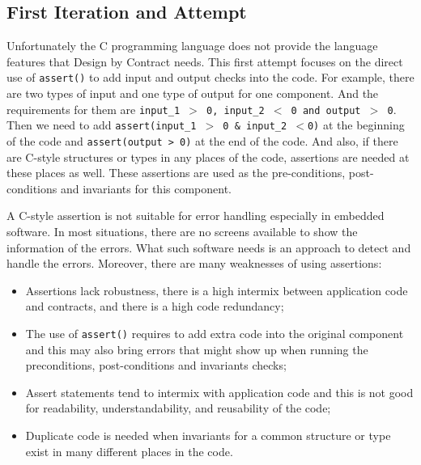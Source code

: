 
\subsection{First Iteration and Attempt}
Unfortunately the C programming language does not provide the language features that Design by Contract needs. This first attempt focuses on the direct use of \texttt{assert()} to add input and output checks into the code. For example, there are two types of input and one type of output for one component. And the requirements for them are \texttt{input\_1 $>$ 0, input\_2 $<$ 0 and output $>$ 0}. Then we need to add \texttt{assert(input\_1 $>$ 0 \& input\_2 $<$0)} at the beginning of the code and \texttt{assert(output >  0)} at the end of the code. And also, if there are C-style structures or types in any places of the code, assertions are needed at these places as well. These assertions are used as the pre-conditions, post-conditions and invariants for this component.


 A C-style assertion is not suitable for error handling especially in embedded software. In most situations, there are no screens available to show the information of the errors. What such software needs is an approach to detect and handle the errors. Moreover, there are many weaknesses of using assertions:

\begin{itemize}
\item Assertions lack robustness, there is a high intermix between application code and contracts, and there is a high code redundancy; 
\item The use of \texttt{assert()} requires to add extra code into the original component and this may also bring errors that might show up when running the preconditions, post-conditions and invariants checks;
\item Assert statements tend to intermix with application code and this is not good for readability, understandability, and reusability of the code;
\item Duplicate code is needed when invariants for a common structure or type exist in many different places in the code. 
\end{itemize}

